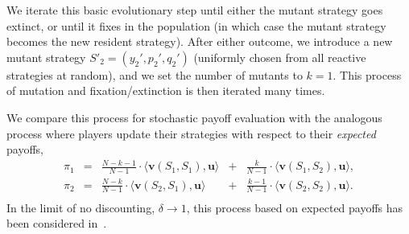 \documentclass[11pt]{article}
\theoremstyle{plainCl1}
\theoremstyle{plainCl2}
\begin{document}
We iterate this basic evolutionary step until either the mutant strategy goes extinct, or until it fixes in the population (in which case the mutant strategy becomes the new resident strategy). After either outcome, we introduce a new mutant strategy $S'_2\!=\!(y_2',p_2',q_2')$ (uniformly chosen from all reactive strategies at random), and we set the number of mutants to $k\!=\!1$. This process of mutation and fixation/extinction is then iterated many times. 

We compare this process for stochastic payoff evaluation with the analogous process where players update their strategies with respect to their {\it expected} payoffs,
\begin{equation} \label{Eq:ExpPay}
\begin{array}{lcrcr}
\displaystyle \pi_1	&=	&\displaystyle \frac{N\!-\!k\!-\!1}{N-1}\cdot \langle\mathbf{v}(S_1,S_1),\mathbf{u}\rangle	&+	&\displaystyle\frac{k}{N-1}\cdot \langle\mathbf{v}(S_1,S_2),\mathbf{u}\rangle,\\[0.5cm]
\displaystyle \pi_2	&=	&\displaystyle\frac{N-k}{N-1}\cdot \langle\mathbf{v}(S_2,S_1),\mathbf{u}\rangle&+	&\displaystyle\frac{k-1}{N-1}\cdot \langle\mathbf{v}(S_2,S_2),\mathbf{u}\rangle.\\
\end{array}
\end{equation}
In the limit of no discounting, $\delta\!\rightarrow\! 1$, this process based on expected payoffs has been considered in~\cite{imhof2010stochastic}. 
\end{document}
